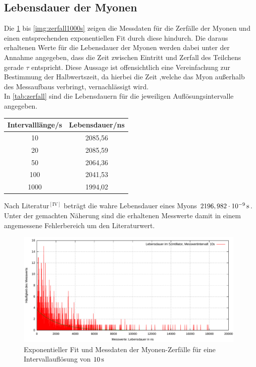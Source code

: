 \documentclass[numbers=noenddot,12pt,a4paper]{scrartcl}
\newcommand{\nummat}[1]{\left[\text{#1}\right]}
\newcommand{\tenpo}[1]{\cdot 10^{#1}}
\begin{document}
\subsection{Lebensdauer der Myonen}
Die \ref{img:zerfall10s} bis \ref{img:zerfall1000s} zeigen die Messdaten für die Zerfälle der Myonen und einen entsprechenden exponentiellen Fit durch diese hindurch. Die daraus erhaltenen Werte für die Lebensdauer der Myonen werden dabei unter der Annahme angegeben, dass die Zeit zwischen Eintritt und Zerfall des Teilchens gerade $\tau$ entspricht. Diese Aussage ist offensichtlich eine Vereinfachung zur Bestimmung der Halbwertszeit, da hierbei die Zeit ,welche das Myon außerhalb des Messaufbaus verbringt, vernachlässigt wird.\\
In \ref{tab:zerfall} sind die Lebensdauern für die jeweiligen Auflösungsintervalle angegeben.
\begin{table}[H]
	\centering
	\begin{tabular}{c|c}
		Intervalllänge/s & Lebensdauer/ns \\ \hline
		10 & 2085,56 \\ \hline
		20 & 2085,59 \\ \hline
		50 & 2064,36 \\ \hline
		100 & 2041,53 \\ \hline
		1000 & 1994,02
	\end{tabular}
\end{table}
Nach Literatur$^{\nummat{IV}}$ beträgt die wahre Lebensdauer eines Myons $\unit[2196,982\tenpo{-9}]{s}$. Unter der gemachten Näherung sind die erhaltenen Messwerte damit in einem angemessene Fehlerbereich um den Literaturwert.
\begin{figure}[H]
	\centering
	\includegraphics[width=\textwidth]{messwerte/lifetime10s.pdf}
	\caption{Exponentieller Fit und Messdaten der Myonen-Zerfälle für eine Intervallauflösung von $\unit[10]{s}$}\label{img:zerfall10s}
\end{figure}
\end{document}
